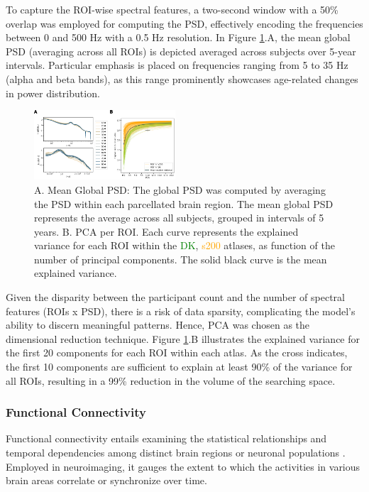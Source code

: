\documentclass{cys}
\begin{document}
To capture the ROI-wise spectral features, a two-second window with a 50\% overlap was employed for computing the PSD, effectively encoding the frequencies between 0 and 500 Hz with a 0.5 Hz resolution.  In Figure \ref{PSD}.A, the mean global PSD (averaging across all ROIs) is depicted averaged across subjects over 5-year intervals. Particular emphasis is placed on frequencies ranging from 5 to 35 Hz (alpha and beta bands), as this range prominently showcases age-related changes in power distribution.

\begin{figure}[H]
\centering
	\includegraphics[width=0.47\textwidth]{PSD+PCA}
	\caption{A. Mean Global PSD: The global PSD was computed by averaging the PSD within each parcellated brain region. The mean global PSD represents the average across all subjects, grouped in intervals of 5 years. B. PCA per ROI. Each curve represents the explained variance for each ROI within the \textcolor{Green}{DK},  \textcolor{Orange}{s200} atlases, as function of the number of principal components. The solid black curve is the mean explained variance.}
	\label{PSD}
\end{figure}

\bigskip
Given the disparity between the participant count and the number of spectral features (ROIs x PSD), there is a risk of data sparsity, complicating the model's ability to discern meaningful patterns. Hence, PCA was chosen as the dimensional reduction technique. Figure \ref{PSD}.B illustrates the explained variance for the first 20 components for each ROI within each atlas. As the cross indicates, the first 10 components are sufficient to explain at least 90\% of the variance for all ROIs, resulting in a 99\% reduction in the volume of the searching space.
\subsubsection{Functional Connectivity}

\smallskip
Functional connectivity entails examining the statistical relationships and temporal dependencies among distinct brain regions or neuronal populations \cite{fingelkurts2005functional}. Employed in neuroimaging, it gauges the extent to which the activities in various brain areas correlate or synchronize over time.
\end{document}
